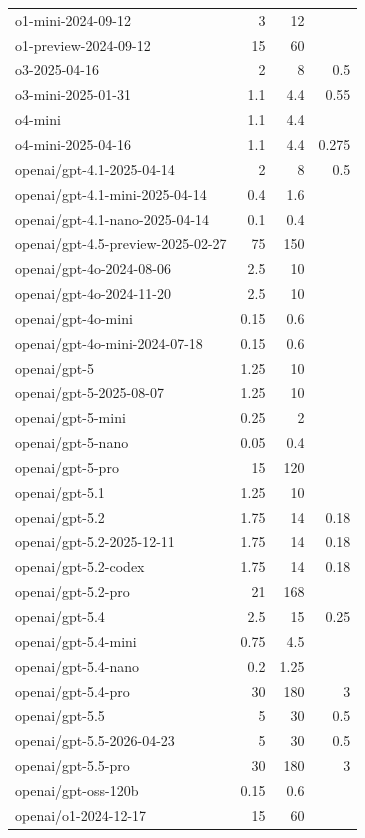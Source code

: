 \begin{longtable}{lrrr}
o1-mini-2024-09-12 & 3 & 12 &  \\
o1-preview-2024-09-12 & 15 & 60 &  \\
o3-2025-04-16 & 2 & 8 & 0.5 \\
o3-mini-2025-01-31 & 1.1 & 4.4 & 0.55 \\
o4-mini & 1.1 & 4.4 &  \\
o4-mini-2025-04-16 & 1.1 & 4.4 & 0.275 \\
openai/gpt-4.1-2025-04-14 & 2 & 8 & 0.5 \\
openai/gpt-4.1-mini-2025-04-14 & 0.4 & 1.6 &  \\
openai/gpt-4.1-nano-2025-04-14 & 0.1 & 0.4 &  \\
openai/gpt-4.5-preview-2025-02-27 & 75 & 150 &  \\
openai/gpt-4o-2024-08-06 & 2.5 & 10 &  \\
openai/gpt-4o-2024-11-20 & 2.5 & 10 &  \\
openai/gpt-4o-mini & 0.15 & 0.6 &  \\
openai/gpt-4o-mini-2024-07-18 & 0.15 & 0.6 &  \\
openai/gpt-5 & 1.25 & 10 &  \\
openai/gpt-5-2025-08-07 & 1.25 & 10 &  \\
openai/gpt-5-mini & 0.25 & 2 &  \\
openai/gpt-5-nano & 0.05 & 0.4 &  \\
openai/gpt-5-pro & 15 & 120 &  \\
openai/gpt-5.1 & 1.25 & 10 &  \\
openai/gpt-5.2 & 1.75 & 14 & 0.18 \\
openai/gpt-5.2-2025-12-11 & 1.75 & 14 & 0.18 \\
openai/gpt-5.2-codex & 1.75 & 14 & 0.18 \\
openai/gpt-5.2-pro & 21 & 168 &  \\
openai/gpt-5.4 & 2.5 & 15 & 0.25 \\
openai/gpt-5.4-mini & 0.75 & 4.5 &  \\
openai/gpt-5.4-nano & 0.2 & 1.25 &  \\
openai/gpt-5.4-pro & 30 & 180 & 3 \\
openai/gpt-5.5 & 5 & 30 & 0.5 \\
openai/gpt-5.5-2026-04-23 & 5 & 30 & 0.5 \\
openai/gpt-5.5-pro & 30 & 180 & 3 \\
openai/gpt-oss-120b & 0.15 & 0.6 &  \\
openai/o1-2024-12-17 & 15 & 60 &  \\

\end{longtable}
